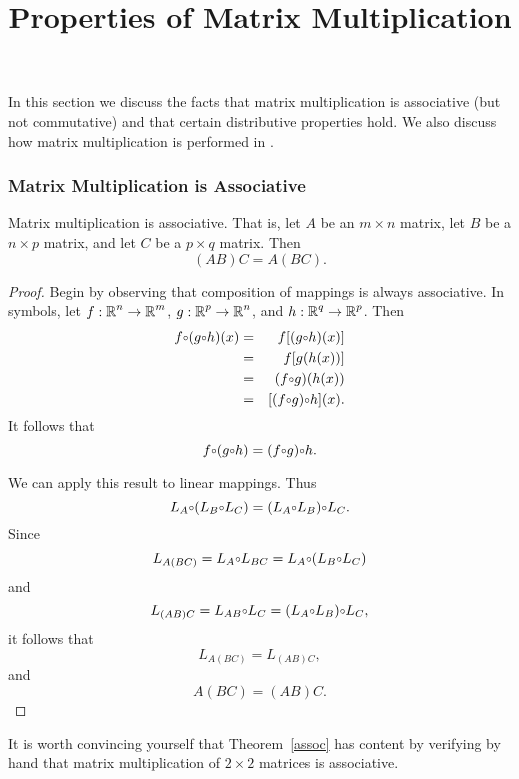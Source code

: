 \documentclass{ximera}
\title{Properties of Matrix Multiplication}
\begin{document}
\begin{abstract}
\end{abstract}
\maketitle

 \label{S:4.7}

In this section we discuss the facts that matrix multiplication is
associative (but not commutative) and that certain distributive
properties hold.  We also discuss how matrix multiplication is
performed in \Matlab.

\subsubsection*{Matrix Multiplication is Associative}

\begin{thm} \label{assoc}
Matrix multiplication is associative.  That is, let $A$ be an
$m\times n$ matrix, let $B$ be a $n\times p$ matrix, and let $C$
be a $p\times q$ matrix.  Then
\[
(AB)C = A(BC).
\]
\end{thm}

\begin{proof} Begin by observing that composition of mappings is always
associative.  In symbols, let $f:\mbox{$\Bbb{R}$}^n\to\mbox{$\Bbb{R}$}^m$, $g:\mbox{$\Bbb{R}$}^p\to\mbox{$\Bbb{R}$}^n$,
and $h:\mbox{$\Bbb{R}$}^q\to\mbox{$\Bbb{R}$}^p$.  Then
\begin{eqnarray*}
f\compose (g\compose h)(x) & = & f[(g\compose h)(x)] \\
  & = & f[g(h(x))] \\
  & = & (f\compose g)(h(x)) \\
  & = & [(f\compose g)\compose h](x).
\end{eqnarray*}
It follows that
\[
f\compose (g\compose h) = (f\compose g)\compose h.
\]

We can apply this result to linear mappings.  Thus
\[
L_A\compose (L_B\compose L_C) = (L_A\compose L_B)\compose L_C.
\]
Since
\[
L_{A(BC)} = L_A\compose L_{BC} = L_A\compose (L_B\compose L_C)
\]
and
\[
L_{(AB)C} = L_{AB}\compose L_C = (L_A\compose L_B)\compose L_C,
\]
it follows that
\[
L_{A(BC)} = L_{(AB)C},
\]
and
\[
A(BC) = (AB)C.
\]
\end{proof}

It is worth convincing yourself that Theorem~\ref{assoc} has
content by verifying by hand that matrix multiplication of
$2\times 2$ matrices is associative.
\end{document}
